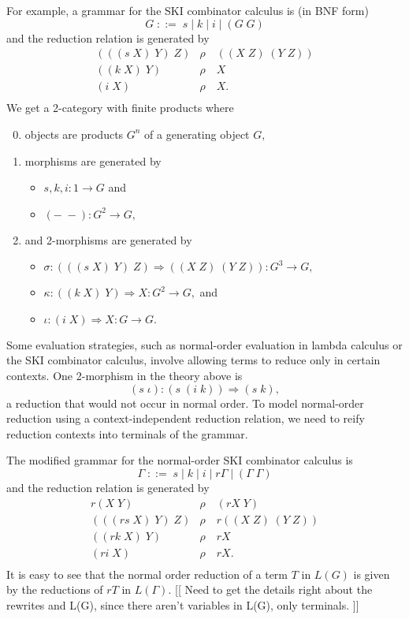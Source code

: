 \documentclass[]{acm_proc_article-sp}
\numberwithin{equation}{subsection}
\begin{document}
For example, a grammar for the SKI combinator calculus is (in BNF form)
\[ G\; ::=\; s\; |\; k\; |\; i\; |\; (G\; G) \]
and the reduction relation is generated by
\[\begin{array}{rl}
  (((s\; X)\; Y)\; Z) & \rho\quad ((X\; Z)\; (Y\; Z))\\
  ((k\; X)\; Y) & \rho\quad X\\
  (i\; X) & \rho\quad X.\\
\end{array}\]
We get a 2-category with finite products where
\begin{enumerate}
  \setcounter{enumi}{-1}
  \item objects are products $G^n$ of a generating object $G,$
  \item morphisms are generated by
  \begin{itemize}
    \item $s, k, i\colon 1 \to G$ and
    \item $(-\;-)\colon G^2 \to G,$
  \end{itemize}
  \item and 2-morphisms are generated by
  \begin{itemize}
    \item $\sigma\colon (((s\; X)\; Y)\; Z) \Rightarrow ((X\; Z)\; (Y\; Z)) \colon {G^3 \to G},$
    \item $\kappa\colon ((k\; X)\; Y) \Rightarrow X \colon {G^2 \to G},$ and
    \item $\iota\colon (i\; X) \Rightarrow X \colon {G \to G}.$
  \end{itemize}
\end{enumerate}

Some evaluation strategies, such as normal-order evaluation in lambda calculus or the SKI combinator calculus, involve allowing terms to reduce only in certain contexts.  One 2-morphism in the theory above is
\[ (s\; \iota)\colon (s\; (i\; k)) \Rightarrow (s\; k),\]
a reduction that would not occur in normal order.  To model normal-order reduction using a context-independent reduction relation, we need to reify reduction contexts into terminals of the grammar.

The modified grammar for the normal-order SKI combinator calculus is
\[ \Gamma\; ::=\; s\; |\; k\; |\; i\; |\; r\Gamma\; |\; (\Gamma\; \Gamma) \]
and the reduction relation is generated by
\[\begin{array}{rl}
  r(X\; Y)  & \rho\quad (rX\; Y) \\
  (((rs\; X)\; Y)\; Z) & \rho\quad r((X\; Z)\; (Y\; Z))\\
  ((rk\; X)\; Y) & \rho\quad rX\\
  (ri\; X)  & \rho\quad rX.\\
\end{array}\]
It is easy to see that the normal order reduction of a term $T$ in $L(G)$ is given by the reductions of $rT$ in $L(\Gamma)$.
[[ Need to get the details right about the rewrites and L(G), since there aren't variables in L(G), only terminals. ]]
\end{document}
